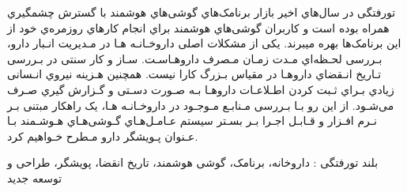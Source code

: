 


\pagestyle{empty}

‌تورفتگی
در سال‌هاي اخیر بازار برنامک‌‌هاي گوشی‌هاي هوشمند با گسترش چشمگیري همراه بوده است و کاربران گوشی‌هاي هوشمند براي انجام کارهاي روزمره‌ي خود از این برنامک‌ها بهره میبرند.
یکی از مشکلات اصلی داروخـانـه هـا در مـدیریت انـبار دارو، بـررسی لحـظه‌اي مـدت زمـان مـصرف داروهـاسـت. سـاز و کار سنتی در بـررسی تـاریخ انـقضاي داروهـا در مقیاس بـزرگ کارا نیست. همچنین هـزینه نیروي انـسانی زیادي بـراي ثـبت کردن اطـلاعـات داروهـا بـه صـورت دسـتی و گـزارش گیري صـرف می‌شـود. از این رو بـا بـررسی مـنابـع مـوجـود در داروخـانـه هـا، یک راهکار مبتنی بـر نـرم افـزار و قـابـل اجـرا بـر بسـتر سیستم عـامـل‌هـاي گـوشی‌‌هـاي هـوشـمند بـا عـنوان پـویشگر دارو مـطرح خـواهیم کرد.

‌بلند
‌تورفتگی : 
داروخانه، برنامک، گوشی هوشمند، تاریخ انقضا، پویشگر، طراحی و توسعه
‌جدید
